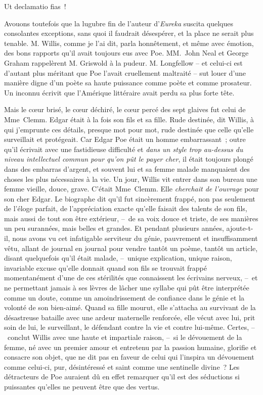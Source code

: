 \documentclass[french,twoside]{book} %
\newenvironment{quoteblock}%
  {\begin{quoting}}
  {\end{quoting}}
\newenvironment{quotebar}{%
    \def\FrameCommand{{\color{rubric!10!}\vrule width 0.5em} \hspace{0.9em}}%
    \def\OuterFrameSep{\itemsep} %
    \MakeFramed {\advance\hsize-\width \FrameRestore}
  }%
  {%
    \endMakeFramed
  }
\renewenvironment{quoteblock}%
  {%
    \savenotes
    \setstretch{0.9}
    \normalfont
    \begin{quotebar}
  }
  {%
    \end{quotebar}
    \spewnotes
  }
\begin{document}
\begin{quoteblock}
 \noindent Ut declamatio fias !
\end{quoteblock}

\noindent Avouons toutefois que la lugubre fin de l’auteur d’\emph{Eureka} suscita quelques consolantes exceptions, sans quoi il faudrait désespérer, et la place ne serait plus tenable. M. Willis, comme je l’ai dit, parla honnêtement, et même avec émotion, des bons rapports qu’il avait toujours eus avec Poe. MM. John Neal et George Graham rappelèrent M. Griswold à la pudeur. M. Longfellow – et celui-ci est d’autant plus méritant que Poe l’avait cruellement maltraité – sut louer d’une manière digne d’un poète sa haute puissance comme poète et comme prosateur. Un inconnu écrivit que l’Amérique littéraire avait perdu sa plus forte tête.\par
Mais le cœur brisé, le cœur déchiré, le cœur percé des sept glaives fut celui de Mme Clemm. Edgar était à la fois son fils et sa fille. Rude destinée, dit Willis, à qui j’emprunte ces détails, presque mot pour mot, rude destinée que celle qu’elle surveillait et protégeait. Car Edgar Poe était un homme embarrassant ; outre qu’il écrivait avec une fastidieuse difficulté et \emph{dans un style trop au-dessus du niveau intellectuel commun pour qu’on pût le payer cher}, il était toujours plongé dans des embarras d’argent, et souvent lui et sa femme malade manquaient des choses les plus nécessaires à la vie. Un jour, Willis vit entrer dans son bureau une femme vieille, douce, grave. C’était Mme Clemm. Elle \emph{cherchait de l’ouvrage} pour son cher Edgar. Le biographe dit qu’il fut sincèrement frappé, non pas seulement de l’éloge parfait, de l’appréciation exacte qu’elle faisait des talents de son fils, mais aussi de tout son être extérieur, – de sa voix douce et triste, de ses manières un peu surannées, mais belles et grandes. Et pendant plusieurs années, ajoute-t-il, nous avons vu cet infatigable serviteur du génie, pauvrement et insuffisamment vêtu, allant de journal en journal pour vendre tantôt un poème, tantôt un article, disant quelquefois qu’il était malade, – unique explication, unique raison, invariable excuse qu’elle donnait quand son fils se trouvait frappé momentanément d’une de ces stérilités que connaissent les écrivains nerveux, – et ne permettant jamais à ses lèvres de lâcher une syllabe qui pût être interprétée comme un doute, comme un amoindrissement de confiance dans le génie et la volonté de son bien-aimé. Quand sa fille mourut, elle s’attacha au survivant de la désastreuse bataille avec une ardeur maternelle renforcée, elle vécut avec lui, prit soin de lui, le surveillant, le défendant contre la vie et contre lui-même. Certes, – conclut Willis avec une haute et impartiale raison, – si le dévouement de la femme, né avec un premier amour et entretenu par la passion humaine, glorifie et consacre son objet, que ne dit pas en faveur de celui qui l’inspira un dévouement comme celui-ci, pur, désintéressé et saint comme une sentinelle divine ? Les détracteurs de Poe auraient dû en effet remarquer qu’il est des séductions si puissantes qu’elles ne peuvent être que des vertus.\par
\end{document}
